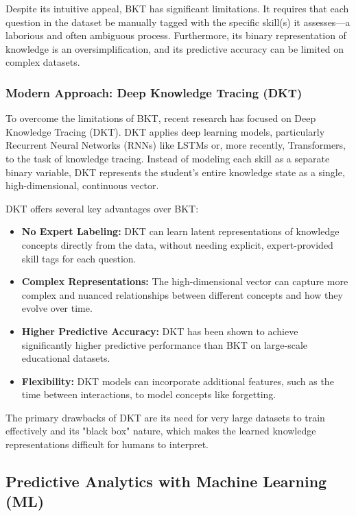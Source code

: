 \documentclass{article}
\begin{document}
Despite its intuitive appeal, BKT has significant limitations. It requires that each question in the dataset be manually tagged with the specific skill(s) it assesses—a laborious and often ambiguous process.\cite{80, 81} Furthermore, its binary representation of knowledge is an oversimplification, and its predictive accuracy can be limited on complex datasets.\cite{81}

\subsubsection{Modern Approach: Deep Knowledge Tracing (DKT)}

To overcome the limitations of BKT, recent research has focused on Deep Knowledge Tracing (DKT). DKT applies deep learning models, particularly Recurrent Neural Networks (RNNs) like LSTMs or, more recently, Transformers, to the task of knowledge tracing.\cite{80, 82, 83} Instead of modeling each skill as a separate binary variable, DKT represents the student's entire knowledge state as a single, high-dimensional, continuous vector.\cite{80}

DKT offers several key advantages over BKT:
\begin{itemize}
    \item \textbf{No Expert Labeling:} DKT can learn latent representations of knowledge concepts directly from the data, without needing explicit, expert-provided skill tags for each question.\cite{80}
    \item \textbf{Complex Representations:} The high-dimensional vector can capture more complex and nuanced relationships between different concepts and how they evolve over time.\cite{80}
    \item \textbf{Higher Predictive Accuracy:} DKT has been shown to achieve significantly higher predictive performance than BKT on large-scale educational datasets.\cite{80}
    \item \textbf{Flexibility:} DKT models can incorporate additional features, such as the time between interactions, to model concepts like forgetting.\cite{83}
\end{itemize}

The primary drawbacks of DKT are its need for very large datasets to train effectively and its "black box" nature, which makes the learned knowledge representations difficult for humans to interpret.\cite{81, 82, 83}

\subsection{Predictive Analytics with Machine Learning (ML)}
\end{document}
